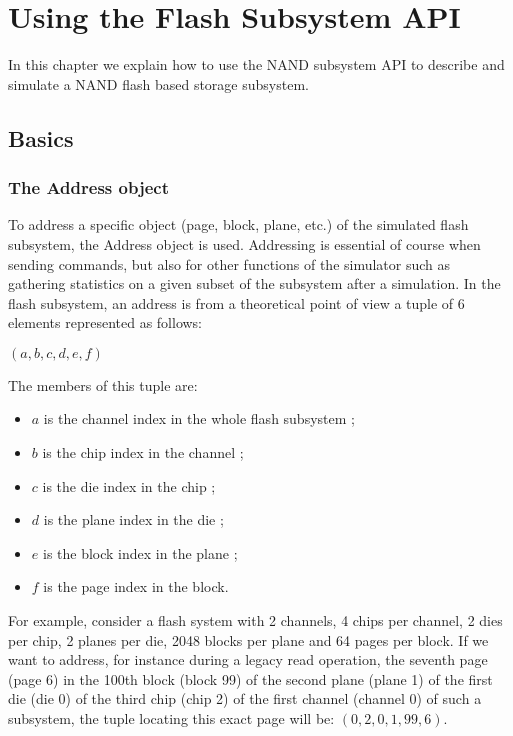 \chapter{Using the Flash Subsystem API}

In this chapter we explain how to use the NAND subsystem API to describe and simulate a NAND flash based storage subsystem.

\section{Basics}

\subsection{The Address object}
To address a specific object (page, block, plane, etc.) of the simulated flash subsystem, the Address object is used. Addressing is essential of course when sending commands, but also for other functions of the simulator such as gathering statistics on a given subset of the subsystem after a simulation. In the flash subsystem, an address is from a theoretical point of view a tuple of 6 elements represented as follows: 

\begin{center}
$(a, b, c, d, e, f)$
\end{center}

The members of this tuple are:
\begin{itemize}
  \item $a$ is the channel index in the whole flash subsystem ;
  \item $b$ is the chip index in the channel ;
  \item $c$ is the die index in the chip ;
  \item $d$ is the plane index in the die ;
  \item $e$ is the block index in the plane ;
  \item $f$ is the page index in the block.
\end{itemize}

For example, consider a flash system with 2 channels, 4 chips per channel, 2 dies per chip, 2 planes per die, 2048 blocks per plane and 64 pages per block. If we want to address, for instance during a legacy read operation, the seventh page (page 6) in the 100th block (block 99) of the second plane (plane 1) of the first die (die 0) of the third chip (chip 2) of the first channel (channel 0) of such a subsystem, the tuple locating this exact page will be: $(0,2,0,1,99,6)$.


